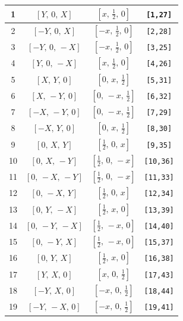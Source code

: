 \documentclass[fleqn,8pt]{jsarticle}
\begin{document}
\begin{longtable}{cccc}
1 & $\left[ Y,\, 0,\, X \right]$ & $\left[ x,\, \frac{1}{2},\, 0 \right]$ & {\tt [1,27]} \\ \hline
2 & $\left[ - Y,\, 0,\, X \right]$ & $\left[ - x,\, \frac{1}{2},\, 0 \right]$ & {\tt [2,28]} \\ \hline
3 & $\left[ - Y,\, 0,\, - X \right]$ & $\left[ - x,\, \frac{1}{2},\, 0 \right]$ & {\tt [3,25]} \\ \hline
4 & $\left[ Y,\, 0,\, - X \right]$ & $\left[ x,\, \frac{1}{2},\, 0 \right]$ & {\tt [4,26]} \\ \hline
5 & $\left[ X,\, Y,\, 0 \right]$ & $\left[ 0,\, x,\, \frac{1}{2} \right]$ & {\tt [5,31]} \\ \hline
6 & $\left[ X,\, - Y,\, 0 \right]$ & $\left[ 0,\, - x,\, \frac{1}{2} \right]$ & {\tt [6,32]} \\ \hline
7 & $\left[ - X,\, - Y,\, 0 \right]$ & $\left[ 0,\, - x,\, \frac{1}{2} \right]$ & {\tt [7,29]} \\ \hline
8 & $\left[ - X,\, Y,\, 0 \right]$ & $\left[ 0,\, x,\, \frac{1}{2} \right]$ & {\tt [8,30]} \\ \hline
9 & $\left[ 0,\, X,\, Y \right]$ & $\left[ \frac{1}{2},\, 0,\, x \right]$ & {\tt [9,35]} \\ \hline
10 & $\left[ 0,\, X,\, - Y \right]$ & $\left[ \frac{1}{2},\, 0,\, - x \right]$ & {\tt [10,36]} \\ \hline
11 & $\left[ 0,\, - X,\, - Y \right]$ & $\left[ \frac{1}{2},\, 0,\, - x \right]$ & {\tt [11,33]} \\ \hline
12 & $\left[ 0,\, - X,\, Y \right]$ & $\left[ \frac{1}{2},\, 0,\, x \right]$ & {\tt [12,34]} \\ \hline
13 & $\left[ 0,\, Y,\, - X \right]$ & $\left[ \frac{1}{2},\, x,\, 0 \right]$ & {\tt [13,39]} \\ \hline
14 & $\left[ 0,\, - Y,\, - X \right]$ & $\left[ \frac{1}{2},\, - x,\, 0 \right]$ & {\tt [14,40]} \\ \hline
15 & $\left[ 0,\, - Y,\, X \right]$ & $\left[ \frac{1}{2},\, - x,\, 0 \right]$ & {\tt [15,37]} \\ \hline
16 & $\left[ 0,\, Y,\, X \right]$ & $\left[ \frac{1}{2},\, x,\, 0 \right]$ & {\tt [16,38]} \\ \hline
17 & $\left[ Y,\, X,\, 0 \right]$ & $\left[ x,\, 0,\, \frac{1}{2} \right]$ & {\tt [17,43]} \\ \hline
18 & $\left[ - Y,\, X,\, 0 \right]$ & $\left[ - x,\, 0,\, \frac{1}{2} \right]$ & {\tt [18,44]} \\ \hline
19 & $\left[ - Y,\, - X,\, 0 \right]$ & $\left[ - x,\, 0,\, \frac{1}{2} \right]$ & {\tt [19,41]} \\ \hline

\end{longtable}
\end{document}

